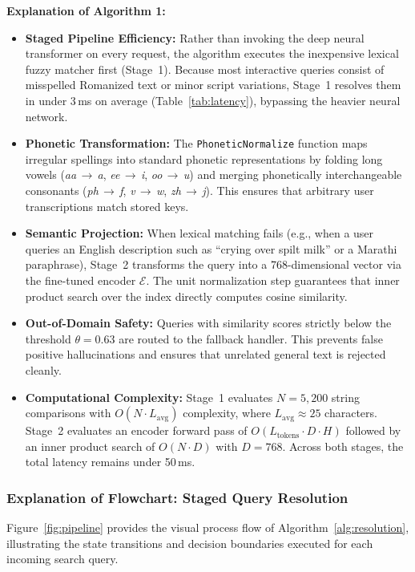 \documentclass[12pt,a4paper]{article}
\begin{document}
\textbf{Explanation of Algorithm 1:}
\begin{itemize}
  \item \textbf{Staged Pipeline Efficiency:} Rather than invoking the deep neural transformer on every request, the algorithm executes the inexpensive lexical fuzzy matcher first (Stage~1). Because most interactive queries consist of misspelled Romanized text or minor script variations, Stage~1 resolves them in under 3\,ms on average (Table~\ref{tab:latency}), bypassing the heavier neural network.
  \item \textbf{Phonetic Transformation:} The \texttt{PhoneticNormalize} function maps irregular spellings into standard phonetic representations by folding long vowels (\emph{aa}\,$\to$\,\emph{a}, \emph{ee}\,$\to$\,\emph{i}, \emph{oo}\,$\to$\,\emph{u}) and merging phonetically interchangeable consonants (\emph{ph}\,$\to$\,\emph{f}, \emph{v}\,$\to$\,\emph{w}, \emph{zh}\,$\to$\,\emph{j}). This ensures that arbitrary user transcriptions match stored keys.
  \item \textbf{Semantic Projection:} When lexical matching fails (e.g., when a user queries an English description such as ``crying over spilt milk'' or a Marathi paraphrase), Stage~2 transforms the query into a 768-dimensional vector via the fine-tuned encoder $\mathcal{E}$. The unit normalization step guarantees that inner product search over the index directly computes cosine similarity.
  \item \textbf{Out-of-Domain Safety:} Queries with similarity scores strictly below the threshold $\theta = 0.63$ are routed to the fallback handler. This prevents false positive hallucinations and ensures that unrelated general text is rejected cleanly.
  \item \textbf{Computational Complexity:} Stage~1 evaluates $N = 5{,}200$ string comparisons with $O(N \cdot L_{\mathrm{avg}})$ complexity, where $L_{\mathrm{avg}} \approx 25$ characters. Stage~2 evaluates an encoder forward pass of $O(L_{\mathrm{tokens}} \cdot D \cdot H)$ followed by an inner product search of $O(N \cdot D)$ with $D = 768$. Across both stages, the total latency remains under 50\,ms.
\end{itemize}

\subsubsection{Explanation of Flowchart: Staged Query Resolution}
Figure~\ref{fig:pipeline} provides the visual process flow of Algorithm~\ref{alg:resolution}, illustrating the state transitions and decision boundaries executed for each incoming search query.
\end{document}
